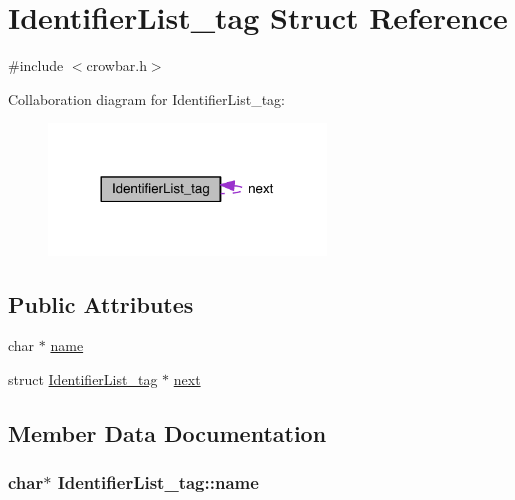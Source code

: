 \hypertarget{struct_identifier_list__tag}{}\section{Identifier\+List\+\_\+tag Struct Reference}
\label{struct_identifier_list__tag}


{\ttfamily \#include $<$crowbar.\+h$>$}



Collaboration diagram for Identifier\+List\+\_\+tag\+:\nopagebreak
\begin{figure}[H]
\begin{center}
\leavevmode
\includegraphics[width=209pt]{struct_identifier_list__tag__coll__graph}
\end{center}
\end{figure}
\subsection*{Public Attributes}
\begin{DoxyCompactItemize}
\item 
char $\ast$ \hyperlink{struct_identifier_list__tag_a35c08fe43ab2ee6ec72d10510a509a36}{name}
\item 
struct \hyperlink{struct_identifier_list__tag}{Identifier\+List\+\_\+tag} $\ast$ \hyperlink{struct_identifier_list__tag_ab078cbf07ee9896784b46a0dca4ccb2d}{next}
\end{DoxyCompactItemize}


\subsection{Member Data Documentation}
\hypertarget{struct_identifier_list__tag_a35c08fe43ab2ee6ec72d10510a509a36}{}
\subsubsection[{name}]{\setlength{\rightskip}{0pt plus 5cm}char$\ast$ Identifier\+List\+\_\+tag\+::name}\label{struct_identifier_list__tag_a35c08fe43ab2ee6ec72d10510a509a36}
\hypertarget{struct_identifier_list__tag_ab078cbf07ee9896784b46a0dca4ccb2d}{}
